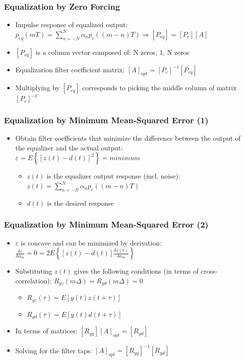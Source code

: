 \documentclass{beamer}
\begin{document}
\begin{frame}
	\frametitle{Equalization by Zero Forcing}
	\begin{itemize}
		\item Impulse response of equalized output: $ p_{eq}(mT) = \sum_{n=-N}^N {\alpha_n p_c((m-n)T)} \Rightarrow [P_{eq}]=[P_c][A] $
		\item $ [P_{eq}] $ is a column vector composed of: N zeros, 1, N zeros
		\item Equalizarion filter coefficient matrix: $ [A]_{opt} = [P_c]^{-1}[P_{eq}] $
		\item Multiplying by $ [P_{eq}] $ corresponds to picking the middle column of matrix $ [P_c]^{-1} $
	\end{itemize}
\end{frame}

\begin{frame}
	\frametitle{Equalization by Minimum Mean-Squared Error (1)}
	\begin{itemize}
		\item Obtain filter coefficients that minimize the difference between the output of the equalizer and the actual output: $ \varepsilon = E\left\{[z(t) - d(t)]^2\right\} = minimum $
		\begin{itemize}
			\item $ z(t) $ is the equalizer output response (incl. noise): $ z(t) = \sum_{n=-N}^N {\alpha_n p_c((m-n)T)} $
			\item $ d(t) $ is the desired response
		\end{itemize}
	\end{itemize}
\end{frame}

\begin{frame}
	\frametitle{Equalization by Minimum Mean-Squared Error (2)}
	\begin{itemize}
		\item $ \varepsilon $ is concave and can be minimized by derivation: $ \frac{\delta\varepsilon}{\delta\alpha_m} = 0 = 2E\left\{[z(t) - d(t)] \frac{\delta z(t)}{\delta\alpha_m} \right\} $
		\item Substituting $ z(t) $ gives the following conditions (in terms of cross-correlation): $ R_{yz}(m\Delta) = R_{yd}(m\Delta) = 0 $
		\begin{itemize}
			\item $ R_{yz}(\tau) = E[y(t)z(t + \tau)] $
			\item $ R_{yd}(\tau) = E[y(t)d(t + \tau)] $
		\end{itemize}
		\item In terms of matrices: $ [R_{yy}][A]_{opt} = [R_{yd}] $
		\item Solving for the filter taps: $ [A]_{opt} = [R_{yy}]^{-1}[R_{yd}] $
	\end{itemize}
\end{frame}
\end{document}
